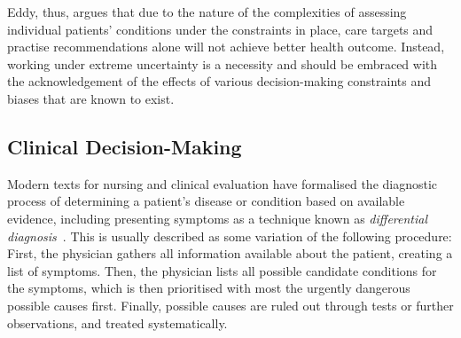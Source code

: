 \documentclass{sigchi}
\begin{document}
Eddy, thus, argues that due to the nature of the complexities of assessing individual patients' conditions under the constraints in place, care targets and practise recommendations alone will not achieve better health outcome.  Instead, working under extreme uncertainty is a necessity and should be embraced with the acknowledgement of the effects of various decision-making constraints and biases that are known to exist.

\subsection{Clinical Decision-Making} 

 Modern texts for nursing and clinical evaluation have formalised the diagnostic process of determining a patient's disease or condition based on available evidence, including presenting symptoms as a technique known as \emph{differential diagnosis}~\cite{thompson2002clinical}.  This is usually described as some variation of the following procedure: First, the physician gathers all information available about the patient, creating a list of symptoms.  Then, the physician lists all possible candidate conditions for the symptoms, which is then prioritised with most the urgently dangerous possible causes first.  Finally, possible causes are ruled out through tests or further observations, and treated systematically.  


\end{document}
